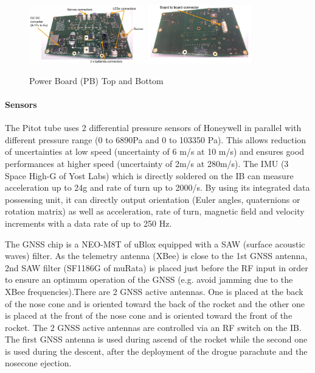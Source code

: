  \begin{figure}[h!]
 	\centering
        \includegraphics[width=0.45\textwidth]{img/AV_FIG_PB_top.jpg}
          \includegraphics[width=0.40\textwidth]{img/AV_FIG_PB_bottom.jpg}
        \caption{Power Board (PB) Top and Bottom}
        \label{f:avionics_pb}
 \end{figure}

\paragraph{Sensors}
 \hfill \break
The Pitot tube uses 2 differential pressure sensors of Honeywell in parallel with different pressure range (0 to 6890Pa and 0 to 103350 Pa). This allows reduction of uncertainties at low speed (uncertainty of 6 m/s at 10 m/s) and ensures good performances at higher speed (uncertainty of 2m/s at 280m/s).
The IMU (3 Space High-G of Yost Labs) which is directly soldered on the IB can measure acceleration up to 24g and rate of turn up to 2000/s.
By using its integrated data possessing unit, it can directly output orientation (Euler angles, quaternions or rotation matrix) as well as acceleration, rate of turn, magnetic field and velocity increments with a data rate of up to 250 Hz.

The GNSS chip is a NEO-M8T of uBlox equipped with a SAW (surface acoustic waves) filter. As the telemetry antenna (XBee) is close to the 1st GNSS antenna, 2nd SAW filter (SF1186G of muRata) is placed just before the RF input in order to ensure an optimum operation of the GNSS (e.g. avoid jamming due to the XBee frequencies).There are 2 GNSS active antennas. One is placed at the back of the nose cone and is oriented toward the back of the rocket and the other one is placed at the front of the nose cone and is oriented toward the front of the rocket. The 2 GNSS active antennas are controlled via an RF switch on the IB. The first GNSS antenna is used during ascend of the rocket while the second one is used during the descent, after the deployment of the drogue parachute and the nosecone ejection.

